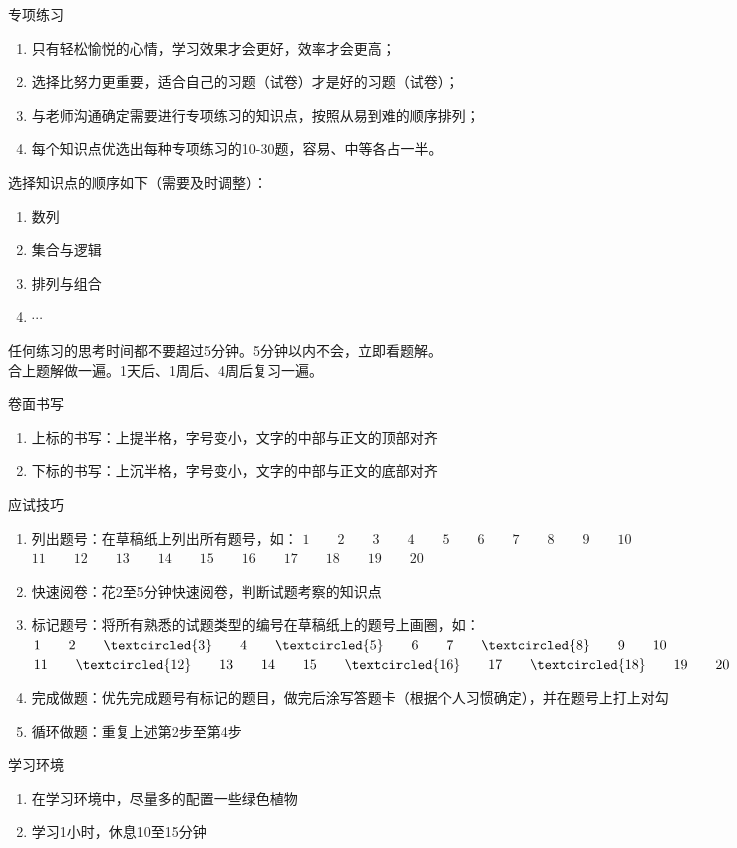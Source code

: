 \documentclass[aspectratio=169]{ctexbeamer} %
\begin{document}
\begin{frame}[t]{专项练习}
\begin{enumerate}[label={\arabic*.}]
\item 只有轻松愉悦的心情，学习效果才会更好，效率才会更高；
\item 选择比努力更重要，适合自己的习题（试卷）才是好的习题（试卷）；
\item 与老师沟通确定需要进行专项练习的知识点，按照从易到难的顺序排列；
\item 每个知识点优选出每种专项练习的10-30题，容易、中等各占一半。
\end{enumerate}
\alert{选择知识点的顺序如下（需要及时调整）：}
\begin{enumerate}[label={\arabic*.}]
\item 数列
\item 集合与逻辑
\item 排列与组合
\item $\cdots$
\end{enumerate}
\alert{任何练习的思考时间都不要超过5分钟。5分钟以内不会，立即看题解。} \\
\alert{合上题解做一遍。1天后、1周后、4周后复习一遍。} \\

\end{frame}

\begin{frame}[t]{卷面书写}
\begin{enumerate}[label={\arabic*.}]
\item 上标的书写：上提半格，字号变小，文字的中部与正文的顶部对齐
\item 下标的书写：上沉半格，字号变小，文字的中部与正文的底部对齐
\end{enumerate}
\end{frame}

\begin{frame}[t]{应试技巧}
\begin{enumerate}[label={\arabic*.}]
\item 列出题号：在草稿纸上列出所有题号，如：
$1 \qquad 2 \qquad 3 \qquad 4 \qquad 5 \qquad 6 \qquad 7 \qquad 8 \qquad 9 \qquad 10$
$11 \qquad 12 \qquad 13 \qquad 14 \qquad 15 \qquad 16 \qquad 17 \qquad 18 \qquad 19 \qquad 20$
\pause
\item 快速阅卷：花2至5分钟快速阅卷，判断试题考察的知识点
\pause
\item 标记题号：将所有熟悉的试题类型的编号在草稿纸上的题号上画圈，如：
$1 \qquad 2 \qquad \textcircled{3} \qquad 4 \qquad \textcircled{5} \qquad 6 \qquad 7 \qquad \textcircled{8} \qquad 9 \qquad 10$
$11 \qquad \textcircled{12} \qquad 13 \qquad 14 \qquad 15 \qquad \textcircled{16} \qquad 17 \qquad \textcircled{18} \qquad 19 \qquad 20$
\pause
\item 完成做题：优先完成题号有标记的题目，做完后涂写答题卡（根据个人习惯确定），并在题号上打上对勾
\pause
\item 循环做题：重复上述第2步至第4步
\end{enumerate}
\end{frame}

\begin{frame}[t]{学习环境}
\begin{enumerate}[label={\arabic*.}]
\item 在学习环境中，尽量多的配置一些绿色植物
\item 学习1小时，休息10至15分钟
\end{enumerate}
\end{frame}
\end{document}
